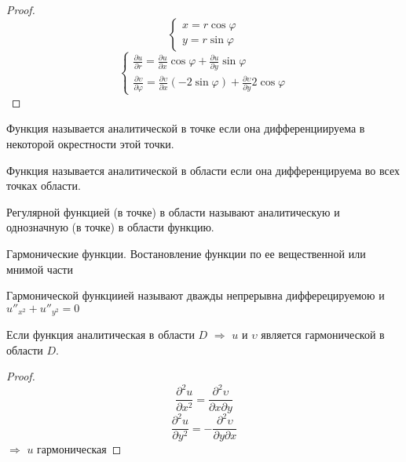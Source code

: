 \begin{proof}
  $$
  \left\{
  \begin{array}{l}
    x = r \cos \varphi \\
    y = r \sin \varphi
  \end{array}
  \right.
  $$
  $$
  \left\{
  \begin{array}{l}
    \frac{\partial u}{\partial r} = \frac{\partial u}{\partial x} \cos \varphi
    + \frac{\partial u}{\partial y} \sin \varphi \\
    \frac{\partial \upsilon}{\partial \varphi} =
    \frac{\partial \upsilon}{\partial x} (-2 \sin \varphi) +
    \frac{\partial \upsilon}{\partial y} 2\cos \varphi
  \end{array}
  \right.
  $$
\end{proof}

\begin{define}
  Функция называется аналитической в точке если она дифференциируема в
  некоторой окрестности этой точки.
\end{define}

\begin{define}
  Функция называется аналитической в области если она дифференцируема во всех
  точках области.
\end{define}

\begin{define}
  Регулярной функцией (в точке) в области называют аналитическую и однозначную
  (в точке) в области функцию.
\end{define}

\begin{title}[\Large]
  Гармонические функции. Востановление функции по ее вещественной или мнимой
  части
\end{title}

\begin{define}
  Гармонической функциией называют дважды непрерывна дифферецируемою и
  $u''_{x^2} + u''_{y^2} = 0$
\end{define}

\begin{theorem}
  Если функция аналитическая в области $D$ $\Rightarrow$ $u$ и $\upsilon$
  является гармонической в области $D$.
\end{theorem}

\begin{proof}
  $$
  \frac{\partial^2 u}{\partial x^2} = \frac{\partial^2
  \upsilon}{\partial x \partial y}
  $$
  $$
  \frac{\partial^2 u}{\partial y^2} = -\frac{\partial^2
  \upsilon}{\partial y \partial x}
  $$
  $\Rightarrow$ $u$ гармоническая
\end{proof}

